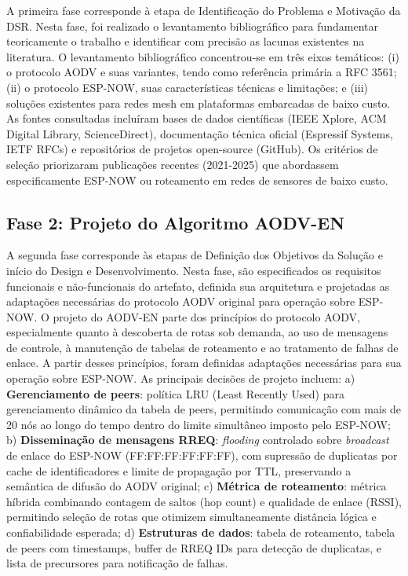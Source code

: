 A primeira fase corresponde à etapa de Identificação do Problema e
Motivação da DSR. Nesta fase, foi realizado o levantamento bibliográfico
para fundamentar teoricamente o trabalho e identificar com precisão as
lacunas existentes na literatura. O levantamento bibliográfico
concentrou-se em três eixos temáticos: (i) o protocolo AODV e suas
variantes, tendo como referência primária a RFC 3561; (ii) o protocolo
ESP-NOW, suas características técnicas e limitações; e (iii) soluções
existentes para redes mesh em plataformas embarcadas de baixo custo. As
fontes consultadas incluíram bases de dados científicas (IEEE Xplore,
ACM Digital Library, ScienceDirect), documentação técnica oficial
(Espressif Systems, IETF RFCs) e repositórios de projetos open-source
(GitHub). Os critérios de seleção priorizaram publicações recentes
(2021-2025) que abordassem especificamente ESP-NOW ou roteamento em
redes de sensores de baixo custo.

\subsection{Fase 2: Projeto do Algoritmo
AODV-EN}\label{fase-2-projeto-do-algoritmo-aodv-en}

A segunda fase corresponde às etapas de Definição dos Objetivos da
Solução e início do Design e Desenvolvimento. Nesta fase, são
especificados os requisitos funcionais e não-funcionais do artefato,
definida sua arquitetura e projetadas as adaptações necessárias do
protocolo AODV original para operação sobre ESP-NOW. O projeto do
AODV-EN parte dos princípios do protocolo AODV, especialmente quanto à
descoberta de rotas sob demanda, ao uso de mensagens de controle, à
manutenção de tabelas de roteamento e ao tratamento de falhas de enlace.
A partir desses princípios, foram definidas adaptações necessárias para
sua operação sobre ESP-NOW. As principais decisões de projeto incluem:
a) \textbf{Gerenciamento de peers}: política LRU (Least Recently Used)
para gerenciamento dinâmico da tabela de peers, permitindo comunicação
com mais de 20 nós ao longo do tempo dentro do limite simultâneo imposto
pelo ESP-NOW; b) \textbf{Disseminação de mensagens RREQ}:
\emph{flooding} controlado sobre \emph{broadcast} de enlace do ESP-NOW
(FF:FF:FF:FF:FF:FF), com supressão de duplicatas por cache de
identificadores e limite de propagação por TTL, preservando a semântica
de difusão do AODV original; c) \textbf{Métrica de roteamento}: métrica
híbrida combinando contagem de saltos (hop count) e qualidade de enlace
(RSSI), permitindo seleção de rotas que otimizem simultaneamente
distância lógica e confiabilidade esperada; d) \textbf{Estruturas de
dados}: tabela de roteamento, tabela de peers com timestamps, buffer de
RREQ IDs para detecção de duplicatas, e lista de precursores para
notificação de falhas.

